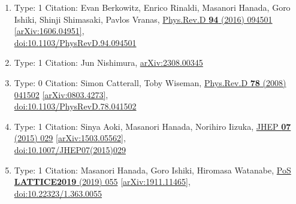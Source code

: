 \documentclass[a4paper,10pt]{article}
\begin{document}
\begin{enumerate}
\begin{enumerate}
  \item Type: 1 Citation: Evan Berkowitz, Enrico Rinaldi, Masanori Hanada, Goro Ishiki, Shinji Shimasaki, Pavlos Vranas, \href{https://www.doi.org/10.1103/PhysRevD.94.094501}{Phys.Rev.D {\bf 94} (2016) 094501}  \href{https://arxiv.org/abs/1606.04951}{[arXiv:1606.04951]},\\\href{https://www.doi.org/10.1103/PhysRevD.94.094501}{doi:10.1103/PhysRevD.94.094501}
  \item Type: 1 Citation: Jun Nishimura, \href{https://arxiv.org/abs/2308.00345}{arXiv:2308.00345}
  \item Type: 0 Citation: Simon Catterall, Toby Wiseman, \href{https://www.doi.org/10.1103/PhysRevD.78.041502}{Phys.Rev.D {\bf 78} (2008) 041502}  \href{https://arxiv.org/abs/0803.4273}{[arXiv:0803.4273]},\\\href{https://www.doi.org/10.1103/PhysRevD.78.041502}{doi:10.1103/PhysRevD.78.041502}
  \item Type: 1 Citation: Sinya Aoki, Masanori Hanada, Norihiro Iizuka, \href{https://www.doi.org/10.1007/JHEP07(2015)029}{JHEP {\bf 07} (2015) 029}  \href{https://arxiv.org/abs/1503.05562}{[arXiv:1503.05562]},\\\href{https://www.doi.org/10.1007/JHEP07(2015)029}{doi:10.1007/JHEP07(2015)029}
  \item Type: 1 Citation: Masanori Hanada, Goro Ishiki, Hiromasa Watanabe, \href{https://www.doi.org/10.22323/1.363.0055}{PoS {\bf LATTICE2019} (2019) 055}  \href{https://arxiv.org/abs/1911.11465}{[arXiv:1911.11465]},\\\href{https://www.doi.org/10.22323/1.363.0055}{doi:10.22323/1.363.0055}

\end{enumerate}
\end{enumerate}
\end{document}
